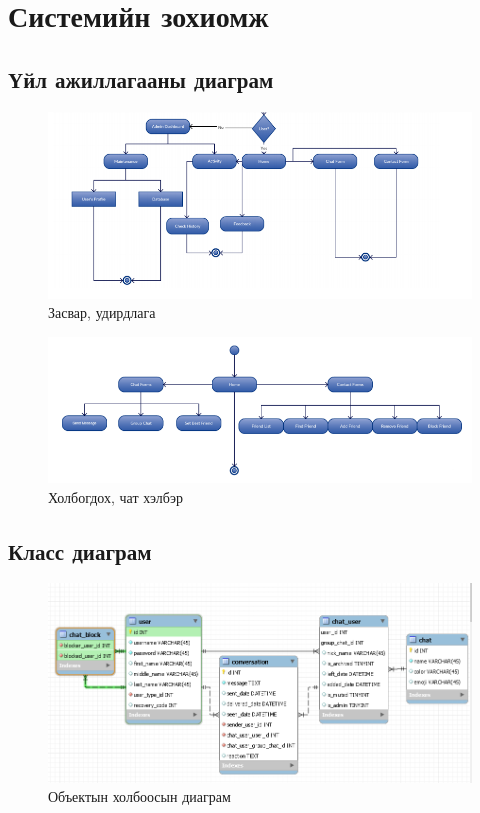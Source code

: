 
\chapter{Системийн зохиомж} %
\label{Chapter3} %

\section{Үйл ажиллагааны диаграм}
\begin{figure}[htbp]
	\centering
	\includegraphics[scale=0.5]{Diagrams/Activity1}
	\caption[Үйл ажиллагааны диаграм]{Засвар, удирдлага}
	\label{fit:Interface}
\end{figure}
\begin{figure}[htbp]
	\centering
	\includegraphics[scale=0.5]{Diagrams/Activity2}
	\caption[Үйл ажиллагааны диаграм]{Холбогдох, чат хэлбэр}
	\label{fit:Activity}
\end{figure}

\section{Класс диаграм}
\begin{figure}[htbp]
	\centering
	\includegraphics[scale=0.4]{Diagrams/ClassEntity}
	\caption[Класс диаграм]{Объектын холбоосын диаграм}
	\label{fit:Interface}
\end{figure}

